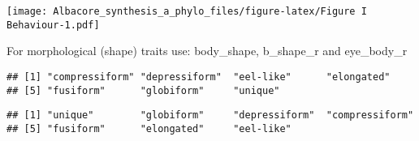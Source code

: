 \documentclass[
]{article}
\newenvironment{Shaded}{\begin{snugshade}}{\end{snugshade}}
\newcommand{\AttributeTok}[1]{\textcolor[rgb]{0.77,0.63,0.00}{#1}}
\newcommand{\FunctionTok}[1]{\textcolor[rgb]{0.00,0.00,0.00}{#1}}
\newcommand{\NormalTok}[1]{#1}
\newcommand{\OtherTok}[1]{\textcolor[rgb]{0.56,0.35,0.01}{#1}}
\newcommand{\SpecialCharTok}[1]{\textcolor[rgb]{0.00,0.00,0.00}{#1}}
\newcommand{\StringTok}[1]{\textcolor[rgb]{0.31,0.60,0.02}{#1}}
\begin{document}
\texttt{[image: Albacore\_synthesis\_a\_phylo\_files/figure-latex/Figure I Behaviour-1.pdf]}

For morphological (shape) traits use: body\_shape, b\_shape\_r and
eye\_body\_r

\begin{Shaded}
\end{Shaded}

\begin{verbatim}
## [1] "compressiform" "depressiform"  "eel-like"      "elongated"    
## [5] "fusiform"      "globiform"     "unique"
\end{verbatim}

\begin{Shaded}
\end{Shaded}

\begin{verbatim}
## [1] "unique"        "globiform"     "depressiform"  "compressiform"
## [5] "fusiform"      "elongated"     "eel-like"
\end{verbatim}
\end{document}
